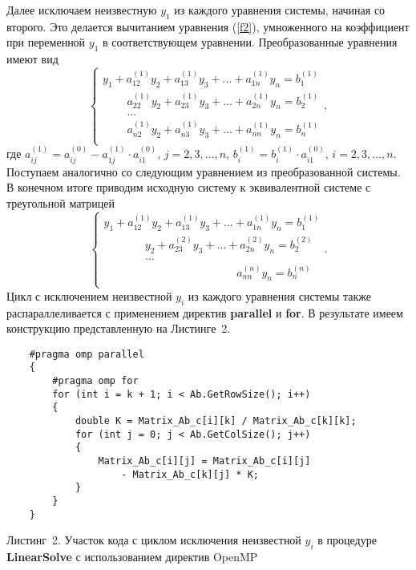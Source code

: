 \documentclass{spisok-article}
\begin{document}
Далее исключаем неизвестную $y_1$ из каждого уравнения системы, начиная со второго. Это делается вычитанием уравнения (\ref{f2}), умноженного на коэффициент при переменной $y_1$ в соответствующем уравнении. Преобразованные уравнения имеют вид
\begin{equation}
	\begin{cases}
		y_1+a_{12}^{\left(1\right)}y_2+a_{13}^{\left(1\right)}y_3+\ldots+a_{1n}^{\left(1\right)}y_n=b_1^{\left(1\right)}\\
		\quad\quad\, a_{22}^{\left(1\right)}y_2+a_{23}^{\left(1\right)}y_3+\ldots+a_{2n}^{\left(1\right)}y_n=b_{2}^{\left(1\right)}\\
		\quad\quad\,\ldots\\
		\quad\quad\, a_{n2}^{\left(1\right)}y_2+a_{n3}^{\left(1\right)}y_3+\ldots+a_{nn}^{\left(1\right)}y_n=b_{n}^{\left(1\right)}\\
	\end{cases},
	\label{f3}
\end{equation}
где $a_{ij}^{\left(1\right)}=a_{ij}^{\left(0\right)}-a_{1j}^{\left(1\right)}\cdot a^{\left(0\right)}_{i1}$, $j=2,3,\ldots,n$, $b_{i}^{\left(1\right)}=b_{i}^{\left(1\right)}\cdot {a^{\left(0\right)}_{i1}}$, $i=2,3,\ldots,n$.
Поступаем аналогично со следующим уравнением из преобразованной системы. В конечном итоге приводим исходную систему к эквивалентной системе с треугольной матрицей
\begin{equation}
	\begin{cases}
		y_1+a_{12}^{\left(1\right)}y_2+a_{13}^{\left(1\right)}y_3+\ldots+a_{1n}^{\left(1\right)}y_n=b_1^{\left(1\right)}\\
		\quad\quad\quad\,\,\,\, y_2+a_{23}^{\left(2\right)}y_3+\ldots+a_{2n}^{\left(2\right)}y_n=b_{2}^{\left(2\right)}\\
		\quad\quad\quad\,\,\,\,\ldots\\
		\quad\quad\, 
		\quad\quad\quad\quad\quad\quad\quad\quad\,\,\,\,\quad a_{nn}^{\left(n\right)}y_n=b_{n}^{\left(n\right)}\\
	\end{cases}.
	\label{f4}
\end{equation}
Цикл с исключением неизвестной $y_i$ из каждого уравнения системы также распараллеливается с применением директив \textbf{parallel} и \textbf{for}. В результате имеем конструкцию представленную на Листинге~2.
\vspace{3mm}
\begin{lstlisting}
	#pragma omp parallel
	{
		#pragma omp for
		for (int i = k + 1; i < Ab.GetRowSize(); i++)
		{
			double K = Matrix_Ab_c[i][k] / Matrix_Ab_c[k][k];
			for (int j = 0; j < Ab.GetColSize(); j++)
			{
				Matrix_Ab_c[i][j] = Matrix_Ab_c[i][j]
					- Matrix_Ab_c[k][j] * K;
			}
		}
	}
\end{lstlisting}
\vspace{-1mm}
\begin{center}
	\small{Листинг~2. Участок кода с циклом исключения неизвестной $y_i$ в процедуре \textbf{LinearSolve} с использованием директив OpenMP}
\end{center}
\end{document}

